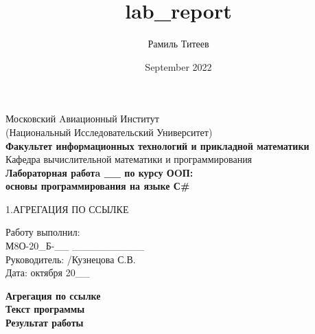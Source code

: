 \documentclass[12pt]{report}
\title{lab_report}
\author{Рамиль Титеев}
\date{September 2022}
\begin{document}
    \begin{titlepage}
        \begin{center}
            \large{Московский Aвиационный Институт}\\
            \large{(Национальный Исследовательский Университет)}\\
            \vspace{0.4in}
            \textbf{\LARGE{Факультет информационных технологий и прикладной математики}}\\
            \vspace{0.4in}
            \large{Кафедра вычислительной математики и программирования}\\
            \vspace{0.4in}
            \textbf{\LARGE{Лабораторная работa __ по курсу ОOП:}}\\
            \textbf{\LARGE{основы программирования на языке С\#}}\\
        \end{center}
        \vspace{0.6in}
        \small{1.АГРЕГАЦИЯ ПО ССЫЛКЕ}\\
        \vfill
        \begin{flushleft}
                \large{ 
                    Работу выполнил:\\
                    М8О-20_Б-__ %
                    \hspace{0.1in} 
                    __________ %
                    \hspace{0.3in}  
                    \hspace{0.3in} 
                    \\ 
                    Руководитель: /Кузнецова С.В. \\
                    Дата: \underline{\hspace{0.4in}} октября 20__\\
                }
        \end{flushleft}        
    \end{titlepage}

    \textbf{\large{Агрегация по ссылке}}\\
    \textbf{Текст программы}\\
    
    \vspace{0.4in}
    \textbf{Результат работы}\\
    
    \begin{center}
    \end{center}
\end{document}
